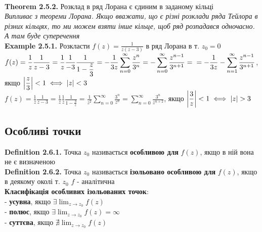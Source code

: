 \documentclass[a4paper, 14pt]{extarticle}
\def\hugespace{\vspace{5mm} \\}
\begin{document}
	 \hugespace
	 \textbf{Theorem 2.5.2.} Розклад в ряд Лорана є єдиним в заданому кільці\\
	 \textit{Випливає з теореми Лорана. Якщо вважати, що є різні розклади ряда Тейлора в різних кільцях, то ми можем взяти інше кільце, щоб ряд розпадався одночасно. А там буде суперечення}
	 \hugespace
	 \textbf{Example 2.5.1.} Розкласти $\displaystyle f(z)=\frac{1}{z(z-3)}$ в ряд Лорана в т. $z_0 = 0$\\
	 $f(z) =  \displaystyle \frac{1}{z} \frac{1}{z-3} = \frac{1}{z} \frac{1}{-3} \frac{1}{1-\displaystyle\frac{z}{3}} = -\frac{1}{3z} \sum_{n=0}^{\infty} \frac{z^n}{3^n} = -\sum_{n=0}^{\infty} \frac{z^{n-1}}{3^{n+1}} = \\= -\frac{1}{3z} - \sum_{n=1}^{\infty} \frac{z^{n-1}}{3^{n+1}}$, якщо $\displaystyle \abs{\frac{z}{3}} <1 \iff \abs{z} < 3 $\\
	 $f(z) = \displaystyle \frac{1}{z} \frac{1}{z-3} = \frac{1}{z} \frac{1}{z} \frac{1}{1-\displaystyle\frac{3}{z}} = \frac{1}{z^2} \sum_{n=0}^{\infty} \frac{3^n}{z^n} = \sum_{n=0}^{\infty} \frac{3^n}{z^{n+2}}$, якщо $\displaystyle \abs{\frac{3}{z}}<1 \iff \abs{z}>3$
	 \hugespace
	 
	 \subsection{Особливі точки}
	 \textbf{Definition 2.6.1.} Точка $z_0$ називається \textbf{особливою для} $f(z)$, якщо в ній вона не є визначеною
	 \hugespace
	 \textbf{Definition 2.6.2.} Точка $z_0$ називається \textbf{ізольовано особливою для} $f(z)$, якщо в деякому околі т. $z_0$ $f$ - аналітична
	 \hugespace
	 \textbf{Класифікація особливих ізольованих точок}:\\
	 - \textbf{усувна}, якщо $\displaystyle\exists \lim_{z \to z_0} f(z)$\\
	 - \textbf{полюс}, якщо $\displaystyle\exists \lim_{z \to z_0} f(z) = \infty$\\
	 - \textbf{суттєва}, якщо $\displaystyle \nexists \lim_{z \to z_0} f(z)$
	 \hugespace
	 
\end{document}
